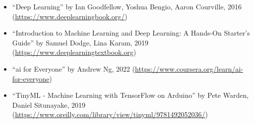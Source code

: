 \begin{frame}
    \begin{itemize}
        \item ``Deep Learning'' by Ian Goodfellow, Yoshua Bengio, Aaron Courville, 2016 (\url{https://www.deeplearningbook.org/})
        \item ``Introduction to Machine Learning and Deep Learning: A Hands-On Starter's Guide'' by Samuel Dodge, Lina Karam, 2019 (\url{https://www.deeplearningtextbook.org})
        \item ``\acs{ai} for Everyone'' by Andrew Ng, 2022 (\url{https://www.coursera.org/learn/ai-for-everyone})
        \item ``TinyML - Machine Learning with TensorFlow on Arduino'' by Pete Warden, Daniel Situnayake, 2019 (\url{https://www.oreilly.com/library/view/tinyml/9781492052036/})
    \end{itemize}
\end{frame}